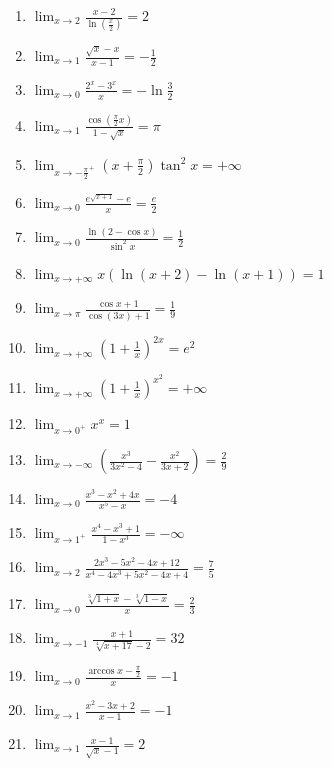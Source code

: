 \documentclass[11pt,a4paper]{article}
\begin{document}
\begin{enumerate}
\item $\displaystyle \lim_{x \to 2} \frac{x - 2}{\ln\left(\frac{x}{2}\right)} = 2$
\item $\displaystyle \lim_{x \to 1} \frac{\sqrt{x} - x}{x - 1} = -\frac{1}{2}$
\item $\displaystyle \lim_{x \to 0} \frac{2^{x} - 3^{x}}{x} = -\ln\frac{3}{2}$
\item $\displaystyle \lim_{x \to 1} \frac{\cos\left(\frac{\pi}{2}x\right)}{1 - \sqrt{x}} = \pi$
\item $\displaystyle \lim_{x \to -\frac{\pi}{2}^{+}} \left(x + \frac{\pi}{2}\right)\tan^{2} x = +\infty$
\item $\displaystyle \lim_{x \to 0} \frac{e^{\sqrt{x + 1}} - e}{x} = \frac{e}{2}$
\item $\displaystyle \lim_{x \to 0} \frac{\ln(2 - \cos x)}{\sin^{2} x} = \frac{1}{2}$
\item $\displaystyle \lim_{x \to +\infty} x(\ln(x + 2) - \ln(x + 1)) = 1$
\item $\displaystyle \lim_{x \to \pi} \frac{\cos x + 1}{\cos(3x) + 1} = \frac{1}{9}$
\item $\displaystyle \lim_{x \to +\infty} \left(1 + \frac{1}{x}\right)^{2x} = e^{2}$
\item $\displaystyle \lim_{x \to +\infty} \left(1 + \frac{1}{x}\right)^{x^{2}} = +\infty$
\item $\displaystyle \lim_{x \to 0^{+}} x^{x} = 1$
\item $\displaystyle \lim_{x \to -\infty} \left(\frac{x^{3}}{3x^{2} - 4} - \frac{x^{2}}{3x + 2}\right) = \frac{2}{9}$
\item $\displaystyle \lim_{x \to 0} \frac{x^{3} - x^{2} + 4x}{x^{5} - x} = -4$
\item $\displaystyle \lim_{x \to 1^{+}} \frac{x^{4} - x^{3} + 1}{1 - x^{3}} = -\infty$
\item $\displaystyle \lim_{x \to 2} \frac{2x^{3} - 5x^{2} - 4x + 12}{x^{4} - 4x^{3} + 5x^{2} - 4x + 4} = \frac{7}{5}$
\item $\displaystyle \lim_{x \to 0} \frac{\sqrt[3]{1 + x} - \sqrt[3]{1 - x}}{x} = \frac{2}{3}$
\item $\displaystyle \lim_{x \to -1} \frac{x + 1}{\sqrt[4]{x + 17} - 2} = 32$
\item $\displaystyle \lim_{x \to 0} \frac{\arccos x - \frac{\pi}{2}}{x} = -1$
\item $\displaystyle \lim_{x \to 1} \frac{x^{2} - 3x + 2}{x - 1} = -1$
\item $\displaystyle \lim_{x \to 1} \frac{x - 1}{\sqrt{x} - 1} = 2$

\end{enumerate}
\end{document}
